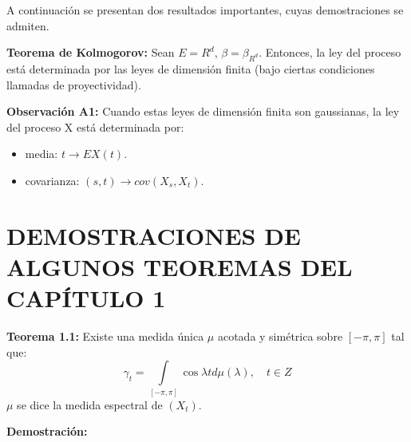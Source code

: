 A continuaci\'{o}n se presentan dos resultados importantes, cuyas demostraciones se admiten.\newline

\textbf{Teorema de Kolmogorov:} Sean $E=R^{d}$, $\beta =\beta_{R^{d}} $. Entonces, la ley del proceso est\'{a} determinada por las leyes de dimensi\'{o}n finita (bajo ciertas condiciones llamadas de proyectividad).\newline

\textbf{Observaci\'{o}n A1:} Cuando estas leyes de dimensi\'{o}n finita son gaussianas, la ley del proceso X est\'{a} determinada por:
\begin{itemize}
      \item media: $t\to EX(t)$.
      \item covarianza: $\left( {s,t} \right)\to cov\left( {X_{s}, X_{t} } \right)$.
\end{itemize}

\section{DEMOSTRACIONES DE ALGUNOS TEOREMAS DEL CAP\'{I}TULO 1}
\textbf{Teorema 1.1:} Existe una medida \'{u}nica $\mu$ acotada y sim\'{e}trica sobre $\left[ {-\pi ,\pi } \right]$ tal que:
\[
\gamma_{t} =\int\limits_{\left[ {-\pi ,\pi } \right]} {\cos \lambda t d\mu \left( \lambda \right)}, \quad t\in Z
\]
$\mu$ se dice la medida espectral de $\left( {X_{t} } \right)$.\newline

\textbf{Demostraci\'{o}n:}\newline

